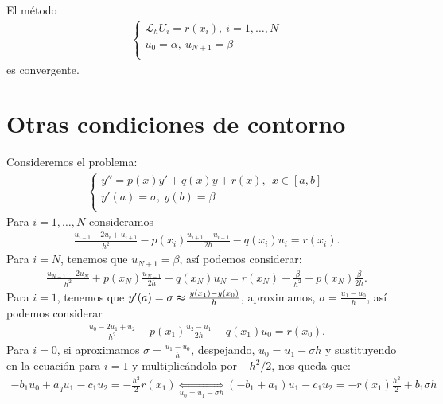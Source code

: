 \begin{cor}
El método
\begin{align*}
    \left\{ \begin{array}{lcc}
             \mathcal{L}_hU_i = r(x_i), \ i = 1,\ldots,N\\
             u_0 = \alpha, \ u_{N+1} = \beta\\
             \end{array}
   \right.
\end{align*}
es convergente.
\end{cor}

\section{Otras condiciones de contorno}

\noindent Consideremos el problema:
\begin{align*}
        \left\{ \begin{array}{lcc}
             y'' = p(x)y' + q(x)y + r(x), \ \ x \in [a,b]\\
             y'(a) = \sigma, \ y(b) = \beta \\
             \end{array}
   \right.
\end{align*}
Para $i = 1,\ldots,N$ consideramos
\begin{align*}
    \frac{u_{i-1} - 2u_i + u_{i+1}}{h^2} -p(x_i)\frac{u_{i+1} - u_{i-1}}{2h} - q(x_i)u_i = r(x_i).
\end{align*}
Para $i = N$, tenemos que $u_{N+1} = \beta$, así podemos considerar:
\begin{align*}
    \frac{u_{N-1} - 2u_N}{h^2} + p(x_N)\frac{u_{N-1}}{2h} -q(x_N)u_N = r(x_N) - \frac{\beta}{h^2} + p(x_N)\frac{\beta}{2h}.
\end{align*}
Para $i = 1$, tenemos que $y'(a) = \sigma \thickapprox \frac{y(x_1)-y(x_0)}{h}$, aproximamos, $\sigma = \frac{u_1 - u_0}{h}$, así podemos considerar
\begin{align*}
    \frac{u_0 - 2u_1 + u_2}{h^2} - p(x_1)\frac{u_2-u_1}{2h} - q(x_1)u_0 = r(x_0).
\end{align*}
Para $i = 0$, si aproximamos $\sigma = \frac{u_1 - u_0}{h}$, despejando, $u_0 = u_1 - \sigma h$ y sustituyendo en la ecuación para $i = 1$ y multiplicándola por $-h^2/2$, nos queda que:
\begin{align*}
    -b_1u_0 +a_qu_1 - c_1u_2 = -\frac{h^2}{2}r(x_1) \underset{u_0 = u_1 - \sigma h}{\Longleftrightarrow} (-b_1 +a_1)u_1 - c_1u_2 = -r(x_1)\frac{h^2}{2} + b_1\sigma h
\end{align*}
